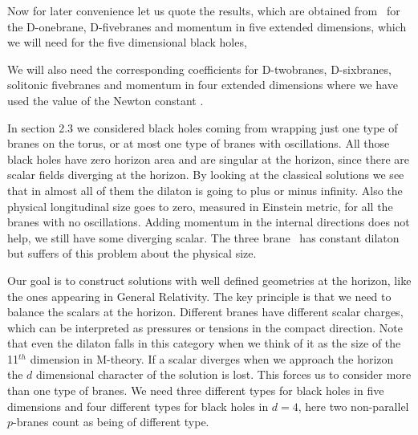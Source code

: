 Now for later convenience let us quote the results, which 
are obtained from \massdbrane \adm \gten\
 for
the D-onebrane, D-fivebranes and momentum in five extended
dimensions, which we will need for the five dimensional
black holes,
\eqn{}

We will also need the corresponding coefficients
for D-twobranes, D-sixbranes, solitonic fivebranes
and momentum in four extended dimensions
\eqn{}
where we have used the value of the Newton constant \gten . 


In section 2.3  we considered black holes 
coming from wrapping just one type of branes on the
torus, or at most one type of branes with oscillations. 
All  those black holes have zero horizon area 
and are singular at the horizon, since there are
scalar fields diverging at the horizon.
By looking at the classical solutions we see that
in almost all of them the dilaton is going to plus or
minus infinity.
 Also the physical longitudinal size goes to zero, 
measured in Einstein metric, for  all the branes with no oscillations.
Adding momentum in the internal directions does not 
help, we still have some diverging scalar. 
The three brane \pbrane\ has constant dilaton but suffers
of this problem about the physical size.

Our goal is to construct solutions with well defined 
geometries at the horizon, like the ones appearing in 
General Relativity. 
The key principle is that we need to balance the scalars
at the horizon. Different branes have different scalar charges,
which can be interpreted as pressures or tensions in the
compact direction. Note that even the dilaton falls in this
category when we think of it as the size of the 11$^{th}$ 
dimension in M-theory. 
If a scalar diverges when we approach the horizon the
$d$ dimensional character of the solution is  lost. 
This forces us to consider more than one type of 
branes. We need three different types for black holes
in five dimensions and four different types for
black holes in $d=4$, here two non-parallel $p$-branes
count as being of different type.

